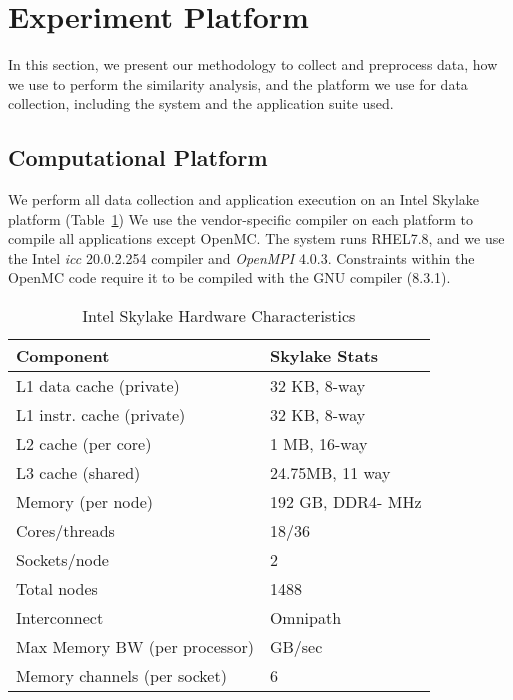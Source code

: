 \section{Experiment Platform}
\label{sec:expPlatform}
In this section, we present our methodology to collect and preprocess data, how we use \us to perform the similarity analysis, and the platform we use for data collection, including the system and the application suite used. 

\subsection{Computational Platform}
We perform all data collection and application execution on an Intel Skylake platform (Table~\ref{tab:platformSpecs})  %
We use the vendor-specific compiler on each platform to compile all applications except OpenMC. The system runs RHEL7.8, and we use the Intel \emph{icc} 20.0.2.254 compiler and \emph{OpenMPI} 4.0.3.  Constraints within the OpenMC code require it to be compiled with the GNU compiler (8.3.1). 

\begin{table}
   \begin{center}
      \caption{Intel Skylake Hardware Characteristics}
      \label{tab:platformSpecs}
    \footnotesize
      \begin{tabular}{ll} 
      \toprule
      \textbf{Component}                   & \textbf{Skylake Stats}           \\ 
      \midrule
      L1 data cache (private) & 32 KB, 8-way  \\ 
      L1 instr. cache (private) & 32 KB, 8-way\\ 
      L2 cache (per core)             & 1 MB, 16-way \\
      L3 cache (shared)     & 24.75MB, 11 way \\
      Memory (per node)        & 192 GB, DDR4- MHz         \\
      Cores/threads        & 18/36 \\ 
      Sockets/node         &  2 \\ 
      Total nodes          &1488 \\ 
      Interconnect  & Omnipath \\ 
      Max Memory BW (per processor)   &  GB/sec       \\ 
      Memory channels (per socket)            & 6           \\ 
      \bottomrule
      \end{tabular}
   \end{center}
\end{table}

